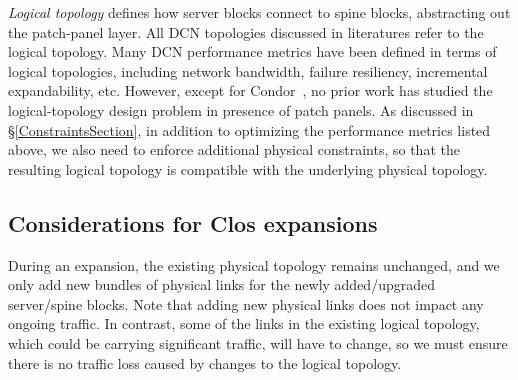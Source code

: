 \documentclass[letterpaper,twocolumn,10pt]{article}
\begin{document}
\emph{Logical topology} defines how server blocks connect to spine blocks, abstracting out the patch-panel layer.  All DCN topologies discussed in literatures refer to the logical topology. Many DCN performance metrics have been defined in terms of logical topologies, including network bandwidth, failure resiliency, incremental expandability, etc. 
However, except for Condor~\cite{Condor}, no prior work has studied the logical-topology design problem in presence of patch panels. 
As discussed in \S\ref{ConstraintsSection}, in addition to optimizing the performance metrics listed above, we also need to enforce additional physical constraints, so that the resulting logical topology is compatible with the underlying physical topology.

\subsection{Considerations for Clos expansions}

During an expansion, the existing physical topology remains unchanged, and we only add new bundles of physical links for the newly added/upgraded server/spine blocks. 
Note that adding new physical links does not impact any ongoing traffic. In contrast, some of the links in the existing logical topology, which could be carrying significant traffic, will have to change, so we must ensure there is no traffic loss caused by changes to the logical topology.
\end{document}
